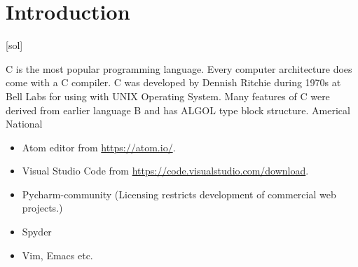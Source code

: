 
\chapter{Introduction}




[\jobname sol\thechapter]



C is the most popular programming language.  Every computer architecture does come with a C compiler. C was developed by Dennish Ritchie during 1970s at Bell Labs for using with UNIX Operating System. Many features of C were derived from earlier language B and has ALGOL type block structure.  Americal National 
\begin{itemize}
	\item Atom editor from \url{https://atom.io/}.
	\item Visual Studio Code from \url{https://code.visualstudio.com/download}. 
	\item Pycharm-community (Licensing restricts development of commercial web projects.)
	\item Spyder
	\item Vim, Emacs etc.
\end{itemize}

 
 


